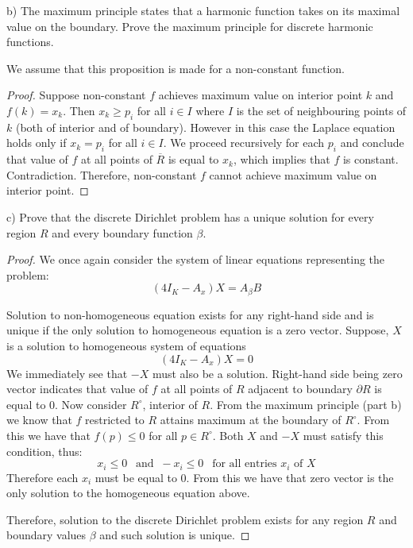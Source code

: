 \documentclass{article}
\begin{document}
\begin{tcolorbox}
b) The maximum principle states that a harmonic function takes on its maximal value on the boundary.
Prove the maximum principle for discrete harmonic functions.
\end{tcolorbox}

We assume that this proposition is made for a non-constant function.

\begin{proof}

Suppose non-constant $f$ achieves maximum value on interior point $k$ and $f(k) = x_k$.
Then $x_k \geq p_i$ for all $i \in I$ where $I$ is the set of neighbouring points of $k$ (both of interior and of boundary).
However in this case the Laplace equation holds only if $x_k = p_i$ for all $i \in I$.
We proceed recursively for each $p_i$ and conclude that value of $f$ at all points of $\overline{R}$ is equal to $x_k$, which implies that $f$ is constant.
Contradiction.
Therefore, non-constant $f$ cannot achieve maximum value on interior point.

\end{proof}

\begin{tcolorbox}
c) Prove that the discrete Dirichlet problem has a unique solution for every region $R$ and every boundary function $\beta$.
\end{tcolorbox}

\begin{proof}

We once again consider the system of linear equations representing the problem:
\[ (4 I_{K} - A_x) X = A_\beta B \]

Solution to non-homogeneous equation exists for any right-hand side and is unique if the only solution to homogeneous equation is a zero vector.
Suppose, $X$ is a solution to homogeneous system of equations
\[ (4 I_{K} - A_x) X = 0 \]
We immediately see that $-X$ must also be a solution.
Right-hand side being zero vector indicates that value of $f$ at all points of $R$ adjacent to boundary $\partial R$ is equal to $0$.
Now consider $R^\circ$, interior of $R$. From the maximum principle (part b) we know that $f$ restricted to $R$ attains maximum at the boundary of $R^\circ$.
From this we have that $f(p) \leq 0$ for all $p \in R^\circ$.
Both $X$ and $-X$ must satisfy this condition, thus:
\[ x_i \leq 0 \>\> \text{ and } \> -x_i \leq 0 \>\> \text{ for all entries $x_i$ of $X$} \]
Therefore each $x_i$ must be equal to $0$.
From this we have that zero vector is the only solution to the homogeneous equation above.

Therefore, solution to the discrete Dirichlet problem exists for any region $R$ and boundary values $\beta$ and such solution is unique.

\end{proof}
\end{document}
